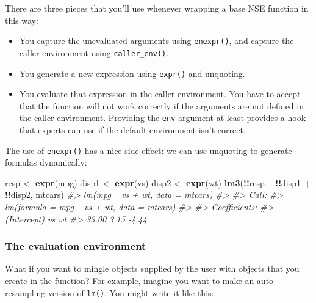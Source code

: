 \documentclass[]{book}
\newenvironment{Shaded}{\begin{snugshade}}{\end{snugshade}}
\newcommand{\CommentTok}[1]{\textcolor[rgb]{0.37,0.37,0.37}{\textit{#1}}}
\newcommand{\KeywordTok}[1]{\textcolor[rgb]{0.27,0.27,0.27}{\textbf{#1}}}
\newcommand{\NormalTok}[1]{#1}
\newcommand{\OperatorTok}[1]{\textcolor[rgb]{0.43,0.43,0.43}{\textbf{#1}}}
\newcommand{\StringTok}[1]{\textcolor[rgb]{0.5,0.5,0.5}{#1}}
\begin{document}
There are three pieces that you'll use whenever wrapping a base NSE function in this way:

\begin{itemize}
\item
  You capture the unevaluated arguments using \texttt{enexpr()}, and capture the caller
  environment using \texttt{caller\_env()}.
\item
  You generate a new expression using \texttt{expr()} and unquoting.
\item
  You evaluate that expression in the caller environment. You have to accept
  that the function will not work correctly if the arguments are not defined
  in the caller environment. Providing the \texttt{env} argument at least provides
  a hook that experts can use if the default environment isn't correct.
\end{itemize}

The use of \texttt{enexpr()} has a nice side-effect: we can use unquoting to generate formulas dynamically:

\begin{Shaded}
\begin{Highlighting}[]
\NormalTok{resp <-}\StringTok{ }\KeywordTok{expr}\NormalTok{(mpg)}
\NormalTok{disp1 <-}\StringTok{ }\KeywordTok{expr}\NormalTok{(vs)}
\NormalTok{disp2 <-}\StringTok{ }\KeywordTok{expr}\NormalTok{(wt)}
\KeywordTok{lm3}\NormalTok{(}\OperatorTok{!!}\NormalTok{resp }\OperatorTok{~}\StringTok{ }\OperatorTok{!!}\NormalTok{disp1 }\OperatorTok{+}\StringTok{ }\OperatorTok{!!}\NormalTok{disp2, mtcars)}
\CommentTok{#> lm(mpg ~ vs + wt, data = mtcars)}
\CommentTok{#> }
\CommentTok{#> Call:}
\CommentTok{#> lm(formula = mpg ~ vs + wt, data = mtcars)}
\CommentTok{#> }
\CommentTok{#> Coefficients:}
\CommentTok{#> (Intercept)           vs           wt  }
\CommentTok{#>       33.00         3.15        -4.44}
\end{Highlighting}
\end{Shaded}

\hypertarget{the-evaluation-environment}{%
\subsubsection{The evaluation environment}\label{the-evaluation-environment}}

What if you want to mingle objects supplied by the user with objects that you create in the function? For example, imagine you want to make an auto-resampling version of \texttt{lm()}. You might write it like this:
\end{document}
